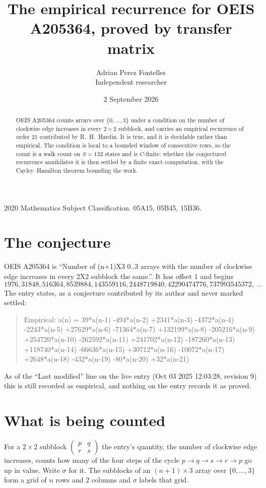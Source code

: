 \documentclass[11pt,a4paper]{article}
\title{The empirical recurrence for OEIS A205364, proved by transfer matrix}
\author{Adrian Perez Fontelles\\ \small Independent researcher}
\date{2 September 2026}
\theoremstyle{plain}
\theoremstyle{definition}
\begin{document}
\maketitle

\begin{abstract}
OEIS A205364 counts arrays over $\{0,\dots,3\}$ under a condition on the number of clockwise edge increases
in every $2\times2$ subblock, and carries an empirical recurrence of order $21$ contributed by
R.~H.~Hardin. It is true, and it is decidable rather than empirical. The condition is local to
a bounded window of consecutive rows, so the count is a walk count on $S=132$ states and is
$C$-finite; whether the conjectured recurrence annihilates it is then settled by a finite exact
computation, with the Cayley--Hamilton theorem bounding the work.
\end{abstract}

\noindent\small 2020 Mathematics Subject Classification. 05A15, 05B45, 15B36.\normalsize

\section{The conjecture}

OEIS A205364 is ``Number of (n+1)X3 0..3 arrays with the number of clockwise edge increases in every 2X2 subblock the same.''. It has offset $1$ and begins
\[
1976, 31848, 516364, 8539884, 143559116, 2448719840, 42290474776, 737993545372,\ \dots
\]
The entry states, as a conjecture contributed by its author and never marked settled:
\begin{quote}
Empirical: a(n) = 39*a(n-1) -494*a(n-2) +2341*a(n-3) -4372*a(n-4) -2243*a(n-5) +27629*a(n-6) -71364*a(n-7) +132199*a(n-8) -205216*a(n-9) +254720*a(n-10) -262592*a(n-11) +241702*a(n-12) -187260*a(n-13) +118740*a(n-14) -66636*a(n-15) +30712*a(n-16) -10072*a(n-17) +2648*a(n-18) -432*a(n-19) -80*a(n-20) +32*a(n-21)
\end{quote}
As of the ``Last modified'' line on the live entry (Oct 03 2025 12:03:28, revision 9) this is still
recorded as empirical, and nothing on the entry records it as proved.

\section{What is being counted}

For a $2\times2$ subblock $\begin{pmatrix}p&q\\r&s\end{pmatrix}$ the
entry's quantity, the number of clockwise edge increases, counts how many of the four steps of the cycle $p\to q\to s\to r\to p$ go up in value. Write $\sigma$ for it. The subblocks of an
$(n+1)\times3$ array over $\{0,\dots,3\}$ form a grid of $n$ rows and $2$
columns and $\sigma$ labels that grid.
\end{document}
